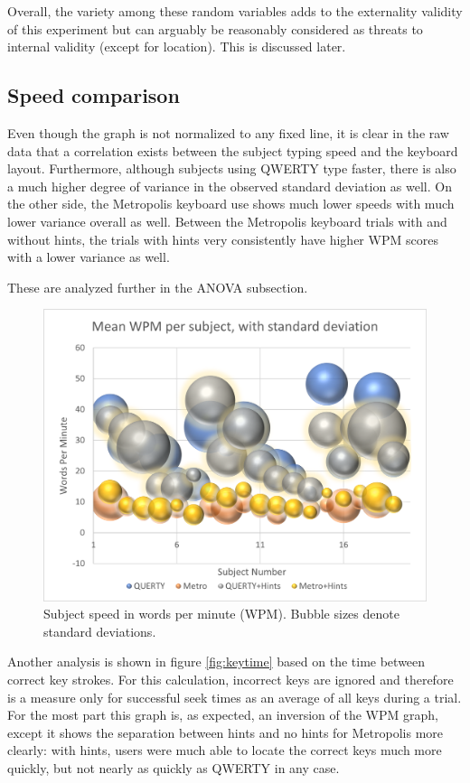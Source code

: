 \documentclass[english]{vgtc}
\begin{document}
Overall, the variety among these random variables adds to the externality validity of this experiment but can arguably be reasonably considered as threats to internal validity (except for location).  This is discussed later.

\subsection{Speed comparison}
Even though the graph is not normalized to any fixed line, it is clear in the raw data that a correlation exists between the subject typing speed and the keyboard layout. Furthermore, although subjects using QWERTY type faster, there is also a much higher degree of variance in the observed standard deviation as well.  On the other side, the
Metropolis keyboard use shows much lower speeds with much lower variance overall as well. Between the Metropolis keyboard trials with and without hints, the trials with hints very consistently have higher WPM scores with a lower variance as well.

These are analyzed further in the ANOVA subsection.

\begin{figure}
  \centering
  \includegraphics[width=0.95\columnwidth]{mean-wpm.png}
  \caption{Subject speed in words per minute (WPM). Bubble sizes denote standard deviations.}
  \label{fig:wpm}
\end{figure}

Another analysis is shown in figure \ref{fig:keytime} based on the time between correct key strokes. For this calculation, incorrect keys are ignored and therefore is a measure only for successful seek times as an average of all keys during a trial.  For the most part this graph is, as expected, an inversion of the WPM graph, except it shows the separation between hints and no hints for Metropolis more clearly: with hints, users were much able to locate the correct keys much more quickly, but not nearly as quickly as QWERTY in any case.
\end{document}
